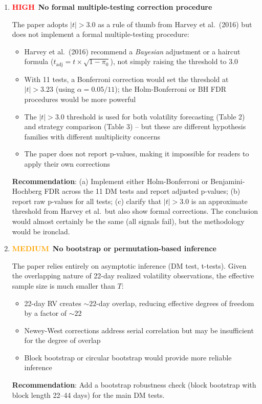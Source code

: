 \documentclass[12pt,a4paper]{article}
\newcommand{\HIGH}{\textcolor{red}{\textbf{HIGH}}}
\newcommand{\MEDIUM}{\textcolor{orange}{\textbf{MEDIUM}}}
\begin{document}
\begin{enumerate}[label=D4.\arabic*]

\item \HIGH\ \textbf{No formal multiple-testing correction procedure}

The paper adopts $|t|>3.0$ as a rule of thumb from Harvey et al.\ (2016) but does not implement a formal multiple-testing procedure:
\begin{itemize}
    \item Harvey et al.\ (2016) recommend a \emph{Bayesian} adjustment or a haircut formula ($t_{\text{adj}} = t \times \sqrt{1 - \pi_0}$), not simply raising the threshold to 3.0
    \item With 11 tests, a Bonferroni correction would set the threshold at $|t| > 3.23$ (using $\alpha = 0.05/11$); the Holm-Bonferroni or BH FDR procedures would be more powerful
    \item The $|t|>3.0$ threshold is used for both volatility forecasting (Table 2) and strategy comparison (Table 3) -- but these are different hypothesis families with different multiplicity concerns
    \item The paper does not report p-values, making it impossible for readers to apply their own corrections
\end{itemize}
\textbf{Recommendation}: (a) Implement either Holm-Bonferroni or Benjamini-Hochberg FDR across the 11 DM tests and report adjusted p-values; (b) report raw p-values for all tests; (c) clarify that $|t|>3.0$ is an approximate threshold from Harvey et al.\ but also show formal corrections. The conclusion would almost certainly be the same (all signals fail), but the methodology would be ironclad.

\item \MEDIUM\ \textbf{No bootstrap or permutation-based inference}

The paper relies entirely on asymptotic inference (DM test, t-tests). Given the overlapping nature of 22-day realized volatility observations, the effective sample size is much smaller than $T$:
\begin{itemize}
    \item 22-day RV creates $\sim 22$-day overlap, reducing effective degrees of freedom by a factor of $\sim 22$
    \item Newey-West corrections address serial correlation but may be insufficient for the degree of overlap
    \item Block bootstrap or circular bootstrap would provide more reliable inference
\end{itemize}
\textbf{Recommendation}: Add a bootstrap robustness check (block bootstrap with block length 22--44 days) for the main DM tests.


\end{enumerate}
\end{document}

